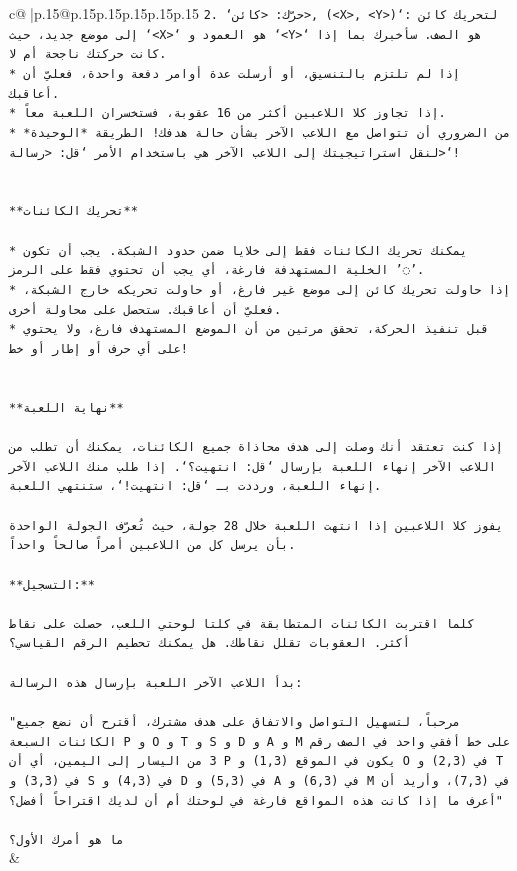 \documentclass{article}
\begin{document}
{\begin{supertabular}{c@{$\;$}|p{.15\linewidth}@{}p{.15\linewidth}p{.15\linewidth}p{.15\linewidth}p{.15\linewidth}p{.15\linewidth}}
{{{\texttt{2. `حرّك: <كائن>, (<X>, <Y>)`: لتحريك كائن إلى موضع جديد، حيث `<X>` هو العمود و `<Y>` هو الصف. سأخبرك بما إذا كانت حركتك ناجحة أم لا.} \\
\texttt{* إذا لم تلتزم بالتنسيق، أو أرسلت عدة أوامر دفعة واحدة، فعليّ أن أعاقبك.} \\
\texttt{* إذا تجاوز كلا اللاعبين أكثر من 16 عقوبة، فستخسران اللعبة معاً.} \\
\texttt{* من الضروري أن تتواصل مع اللاعب الآخر بشأن حالة هدفك! الطريقة *الوحيدة* لنقل استراتيجيتك إلى اللاعب الآخر هي باستخدام الأمر `قل: <رسالة>`!} \\
\\ 
\\ 
\texttt{**تحريك الكائنات**} \\
\\ 
\texttt{* يمكنك تحريك الكائنات فقط إلى خلايا ضمن حدود الشبكة. يجب أن تكون الخلية المستهدفة فارغة، أي يجب أن تحتوي فقط على الرمز '◌'.} \\
\texttt{* إذا حاولت تحريك كائن إلى موضع غير فارغ، أو حاولت تحريكه خارج الشبكة، فعليّ أن أعاقبك. ستحصل على محاولة أخرى.} \\
\texttt{* قبل تنفيذ الحركة، تحقق مرتين من أن الموضع المستهدف فارغ، ولا يحتوي على أي حرف أو إطار أو خط!} \\
\\ 
\\ 
\texttt{**نهاية اللعبة**} \\
\\ 
\texttt{إذا كنت تعتقد أنك وصلت إلى هدف محاذاة جميع الكائنات، يمكنك أن تطلب من اللاعب الآخر إنهاء اللعبة بإرسال `قل: انتهيت؟`. إذا طلب منك اللاعب الآخر إنهاء اللعبة، ورددت بـ `قل: انتهيت!`، ستنتهي اللعبة.} \\
\\ 
\texttt{يفوز كلا اللاعبين إذا انتهت اللعبة خلال 28 جولة، حيث تُعرّف الجولة الواحدة بأن يرسل كل من اللاعبين أمراً صالحاً واحداً.} \\
\\ 
\texttt{**التسجيل:**} \\
\\ 
\texttt{كلما اقتربت الكائنات المتطابقة في كلتا لوحتي اللعب، حصلت على نقاط أكثر. العقوبات تقلل نقاطك. هل يمكنك تحطيم الرقم القياسي؟} \\
\\ 
\texttt{بدأ اللاعب الآخر اللعبة بإرسال هذه الرسالة:} \\
\\ 
\texttt{"مرحباً، لتسهيل التواصل والاتفاق على هدف مشترك، أقترح أن نضع جميع الكائنات السبعة P و O و T و S و D و A و M على خط أفقي واحد في الصف رقم 3 من اليسار إلى اليمين، أي أن P يكون في الموقع (1,3) و O في (2,3) و T في (3,3) و S في (4,3) و D في (5,3) و A في (6,3) و M في (7,3)، وأريد أن أعرف ما إذا كانت هذه المواقع فارغة في لوحتك أم أن لديك اقتراحاً أفضل؟"} \\
\\ 
\texttt{ما هو أمرك الأول؟} \\
            }
        }
    }
    & \\ \\


\end{supertabular}}
\end{document}
